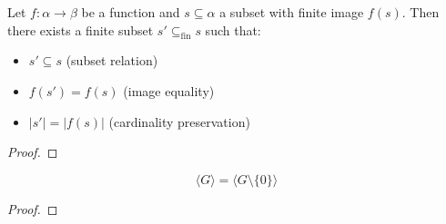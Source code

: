         \begin{lemma}\label{finset_subset_preimage_of_finite_image}
          
          \leanok
          Let $f: \alpha \to \beta$ be a function and $s \subseteq \alpha$ a subset with finite image $f(s)$. Then there exists a finite subset $s' \subseteq_{\text{fin}} s$ such that:
\begin{itemize}
\item $s' \subseteq s$ (subset relation)
\item $f(s') = f(s)$ (image equality)
\item $|s'| = |f(s)|$ (cardinality preservation)
\end{itemize}

        \end{lemma}
        
        \begin{proof}
          
          \leanok
        \end{proof}
        

        \begin{lemma}\label{Submodule.span_sdiff_singleton_zero}
          
          \leanok
          \[
  \langle G \rangle = \langle G \setminus \{0\} \rangle
\]

        \end{lemma}
        
        \begin{proof}
          
          \leanok
        \end{proof}
        
